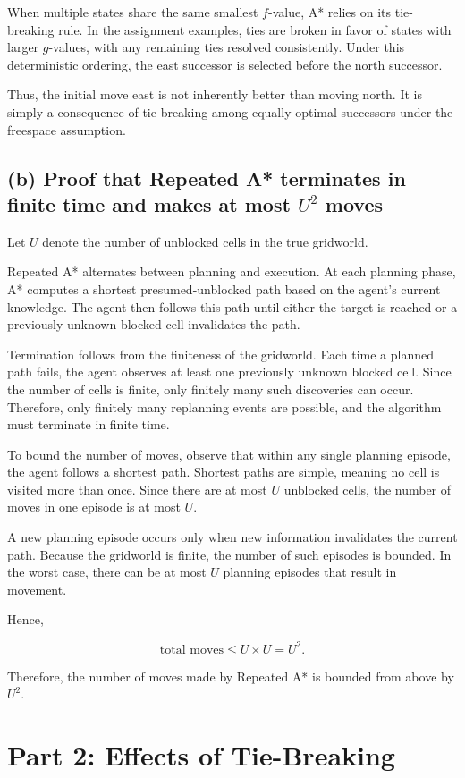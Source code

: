 \documentclass{article}
\begin{document}
When multiple states share the same smallest $f$-value, A* relies on its tie-breaking rule. In the assignment examples, ties are broken in favor of states with larger $g$-values, with any remaining ties resolved consistently. Under this deterministic ordering, the east successor is selected before the north successor.

Thus, the initial move east is not inherently better than moving north. It is simply a consequence of tie-breaking among equally optimal successors under the freespace assumption.

\subsection{(b) Proof that Repeated A* terminates in finite time and makes at most $U^2$ moves}

Let $U$ denote the number of unblocked cells in the true gridworld.

Repeated A* alternates between planning and execution. At each planning phase, A* computes a shortest presumed-unblocked path based on the agent’s current knowledge. The agent then follows this path until either the target is reached or a previously unknown blocked cell invalidates the path.

Termination follows from the finiteness of the gridworld. Each time a planned path fails, the agent observes at least one previously unknown blocked cell. Since the number of cells is finite, only finitely many such discoveries can occur. Therefore, only finitely many replanning events are possible, and the algorithm must terminate in finite time.

To bound the number of moves, observe that within any single planning episode, the agent follows a shortest path. Shortest paths are simple, meaning no cell is visited more than once. Since there are at most $U$ unblocked cells, the number of moves in one episode is at most $U$.

A new planning episode occurs only when new information invalidates the current path. Because the gridworld is finite, the number of such episodes is bounded. In the worst case, there can be at most $U$ planning episodes that result in movement.

Hence,

\[
\text{total moves} \le U \times U = U^2.
\]

Therefore, the number of moves made by Repeated A* is bounded from above by $U^2$.

\section{Part 2: Effects of Tie-Breaking}
\end{document}
